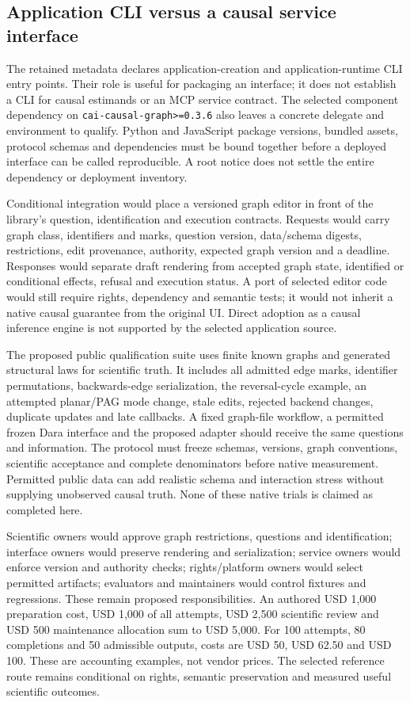 \subsection{Application CLI versus a causal service interface}
The retained metadata declares application-creation and application-runtime
CLI entry points. Their role is useful for packaging an interface; it does
not establish a CLI for causal estimands or an MCP service contract. The
selected component dependency on \texttt{cai-causal-graph>=0.3.6} also leaves
a concrete delegate and environment to qualify. Python and JavaScript
package versions, bundled assets, protocol schemas and dependencies must be
bound together before a deployed interface can be called reproducible.
A root notice does not settle the entire dependency or deployment inventory.
\citep{exec25_dara_source}

Conditional integration would place a versioned graph editor in front of the
library's question, identification and execution contracts. Requests would
carry graph class, identifiers and marks, question version, data/schema
digests, restrictions, edit provenance, authority, expected graph version and
a deadline. Responses would separate draft rendering from accepted graph
state, identified or conditional effects, refusal and execution status. A
port of selected editor code would still require rights, dependency and
semantic tests; it would not inherit a native causal guarantee from the
original UI. Direct adoption as a causal inference engine is not supported
by the selected application source.~\citep{exec25_dara_choice}

The proposed public qualification suite uses finite known graphs and generated
structural laws for scientific truth. It includes all admitted edge marks,
identifier permutations, backwards-edge serialization, the reversal-cycle
example, an attempted planar/PAG mode change, stale edits, rejected backend
changes, duplicate updates and late callbacks. A fixed graph-file workflow,
a permitted frozen Dara interface and the proposed adapter should receive
the same questions and information. The protocol must freeze schemas,
versions, graph conventions, scientific acceptance and complete denominators
before native measurement. Permitted public data can add realistic schema
and interaction stress without supplying unobserved causal truth. None of
these native trials is claimed as completed here.~\citep{exec25_dara_choice}

Scientific owners would approve graph restrictions, questions and
identification; interface owners would preserve rendering and serialization;
service owners would enforce version and authority checks; rights/platform
owners would select permitted artifacts; evaluators and maintainers would
control fixtures and regressions. These remain proposed responsibilities.
An authored USD 1,000 preparation cost, USD 1,000 of all attempts,
USD 2,500 scientific review and USD 500 maintenance allocation sum to
USD 5,000. For 100 attempts, 80 completions and 50 admissible outputs, costs
are USD 50, USD 62.50 and USD 100. These are accounting examples, not vendor
prices. The selected reference route remains conditional on rights,
semantic preservation and measured useful scientific outcomes.
\citep{exec25_dara_choice}
